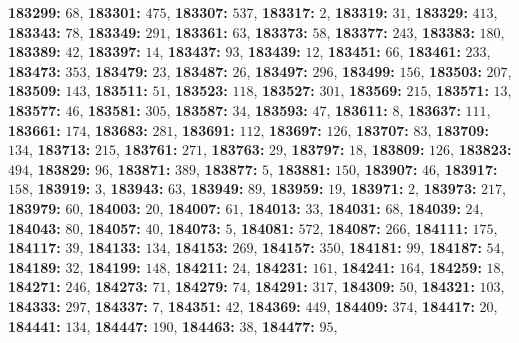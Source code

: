 \textsf{\bfseries 183299:} $68$, \textsf{\bfseries 183301:} $475$, \textsf{\bfseries 183307:} $537$, \textsf{\bfseries 183317:} $2$, \textsf{\bfseries 183319:} $31$, \textsf{\bfseries 183329:} $413$, \textsf{\bfseries 183343:} $78$, \textsf{\bfseries 183349:} $291$, \textsf{\bfseries 183361:} $63$, \textsf{\bfseries 183373:} $58$, \textsf{\bfseries 183377:} $243$, \textsf{\bfseries 183383:} $180$, \textsf{\bfseries 183389:} $42$, \textsf{\bfseries 183397:} $14$, \textsf{\bfseries 183437:} $93$, \textsf{\bfseries 183439:} $12$, \textsf{\bfseries 183451:} $66$, \textsf{\bfseries 183461:} $233$, \textsf{\bfseries 183473:} $353$, \textsf{\bfseries 183479:} $23$, \textsf{\bfseries 183487:} $26$, \textsf{\bfseries 183497:} $296$, \textsf{\bfseries 183499:} $156$, \textsf{\bfseries 183503:} $207$, \textsf{\bfseries 183509:} $143$, \textsf{\bfseries 183511:} $51$, \textsf{\bfseries 183523:} $118$, \textsf{\bfseries 183527:} $301$, \textsf{\bfseries 183569:} $215$, \textsf{\bfseries 183571:} $13$, \textsf{\bfseries 183577:} $46$, \textsf{\bfseries 183581:} $305$, \textsf{\bfseries 183587:} $34$, \textsf{\bfseries 183593:} $47$, \textsf{\bfseries 183611:} $8$, \textsf{\bfseries 183637:} $111$, \textsf{\bfseries 183661:} $174$, \textsf{\bfseries 183683:} $281$, \textsf{\bfseries 183691:} $112$, \textsf{\bfseries 183697:} $126$, \textsf{\bfseries 183707:} $83$, \textsf{\bfseries 183709:} $134$, \textsf{\bfseries 183713:} $215$, \textsf{\bfseries 183761:} $271$, \textsf{\bfseries 183763:} $29$, \textsf{\bfseries 183797:} $18$, \textsf{\bfseries 183809:} $126$, \textsf{\bfseries 183823:} $494$, \textsf{\bfseries 183829:} $96$, \textsf{\bfseries 183871:} $389$, \textsf{\bfseries 183877:} $5$, \textsf{\bfseries 183881:} $150$, \textsf{\bfseries 183907:} $46$, \textsf{\bfseries 183917:} $158$, \textsf{\bfseries 183919:} $3$, \textsf{\bfseries 183943:} $63$, \textsf{\bfseries 183949:} $89$, \textsf{\bfseries 183959:} $19$, \textsf{\bfseries 183971:} $2$, \textsf{\bfseries 183973:} $217$, \textsf{\bfseries 183979:} $60$, \textsf{\bfseries 184003:} $20$, \textsf{\bfseries 184007:} $61$, \textsf{\bfseries 184013:} $33$, \textsf{\bfseries 184031:} $68$, \textsf{\bfseries 184039:} $24$, \textsf{\bfseries 184043:} $80$, \textsf{\bfseries 184057:} $40$, \textsf{\bfseries 184073:} $5$, \textsf{\bfseries 184081:} $572$, \textsf{\bfseries 184087:} $266$, \textsf{\bfseries 184111:} $175$, \textsf{\bfseries 184117:} $39$, \textsf{\bfseries 184133:} $134$, \textsf{\bfseries 184153:} $269$, \textsf{\bfseries 184157:} $350$, \textsf{\bfseries 184181:} $99$, \textsf{\bfseries 184187:} $54$, \textsf{\bfseries 184189:} $32$, \textsf{\bfseries 184199:} $148$, \textsf{\bfseries 184211:} $24$, \textsf{\bfseries 184231:} $161$, \textsf{\bfseries 184241:} $164$, \textsf{\bfseries 184259:} $18$, \textsf{\bfseries 184271:} $246$, \textsf{\bfseries 184273:} $71$, \textsf{\bfseries 184279:} $74$, \textsf{\bfseries 184291:} $317$, \textsf{\bfseries 184309:} $50$, \textsf{\bfseries 184321:} $103$, \textsf{\bfseries 184333:} $297$, \textsf{\bfseries 184337:} $7$, \textsf{\bfseries 184351:} $42$, \textsf{\bfseries 184369:} $449$, \textsf{\bfseries 184409:} $374$, \textsf{\bfseries 184417:} $20$, \textsf{\bfseries 184441:} $134$, \textsf{\bfseries 184447:} $190$, \textsf{\bfseries 184463:} $38$, \textsf{\bfseries 184477:} $95$, 
